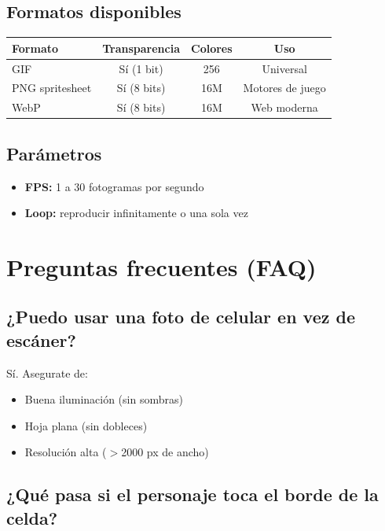 \documentclass[12pt,a4paper]{article}
\begin{document}
\subsection{Formatos disponibles}

\begin{table}[h]
\centering
\begin{tabular}{@{}lccc@{}}
\toprule
\textbf{Formato} & \textbf{Transparencia} & \textbf{Colores} & \textbf{Uso} \\
\midrule
GIF              & Sí (1 bit)   & 256   & Universal \\
PNG spritesheet  & Sí (8 bits)  & 16M   & Motores de juego \\
WebP             & Sí (8 bits)  & 16M   & Web moderna \\
\bottomrule
\end{tabular}
\end{table}

\subsection{Parámetros}
\begin{itemize}[leftmargin=*]
    \item \textbf{FPS:} 1 a 30 fotogramas por segundo
    \item \textbf{Loop:} reproducir infinitamente o una sola vez
\end{itemize}

\section{Preguntas frecuentes (FAQ)}

\subsection{¿Puedo usar una foto de celular en vez de escáner?}

Sí. Asegurate de:
\begin{itemize}[leftmargin=*]
    \item Buena iluminación (sin sombras)
    \item Hoja plana (sin dobleces)
    \item Resolución alta ($>$2000 px de ancho)
\end{itemize}

\subsection{¿Qué pasa si el personaje toca el borde de la celda?}
\end{document}
